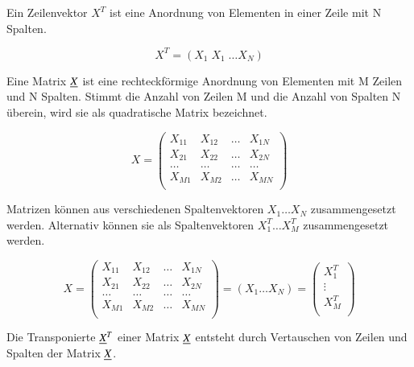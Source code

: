 \noindent Ein Zeilenvektor $X^{T}$ ist eine Anordnung von Elementen in einer Zeile mit N Spalten.

\begin{equation}\label{eq:fifteenfour}
X^{T}=(X_{1}\;X_{1}\; \dots X_{N})
\end{equation}

\noindent Eine Matrix $\underline{X}$ ist eine rechteckf\"{o}rmige Anordnung von Elementen mit M Zeilen und N Spalten. Stimmt die Anzahl von Zeilen M und die Anzahl von Spalten N \"{u}berein, wird sie als quadratische Matrix bezeichnet. 

\begin{equation}\label{eq:fifteenfive}
X=
\begin{pmatrix}
X_{11} & X_{12} & \dots & X_{1N}\\
X_{21} & X_{22} & \dots & X_{2N}\\
\dots & \dots & \dots & \dots\\
X_{M1} & X_{M2} & \dots & X_{MN}\\
\end{pmatrix}
\end{equation}

\noindent Matrizen k\"{o}nnen aus verschiedenen Spaltenvektoren $X_{1} \dots X_{N}$ zusammengesetzt werden. Alternativ k\"{o}nnen sie als Spaltenvektoren $X_{1}^{T} \dots X_{M}^{T}$ zusammengesetzt werden.

\begin{equation}\label{eq:fifteensix}
X=
\begin{pmatrix}
X_{11} & X_{12} & \dots & X_{1N}\\
X_{21} & X_{22} & \dots & X_{2N}\\
\dots & \dots & \dots & \dots\\
X_{M1} & X_{M2} & \dots & X_{MN}\\
\end{pmatrix}
= (X_{1} \dots X_{N}) = 
\begin{pmatrix}
X_{1}^{T}\\
\vdots\\
X_{M}^{T}\\
\end{pmatrix}
\end{equation}

\noindent Die Transponierte $\underline{X}^{T}$ einer Matrix $\underline{X}$ entsteht durch Vertauschen von Zeilen und Spalten der Matrix $\underline{X}$.

